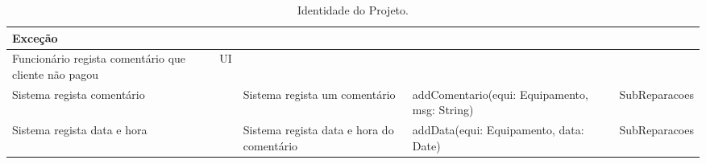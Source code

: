 \documentclass[../relatorio.tex]{subfiles}
\begin{document}
\begin{landscape}
\begin{table}[!h]
\begin{tabular}{|p{5cm}|p{1cm}|p{4cm}|p{6cm}|p{3cm}|}
            \rowcolor{red!30}
            Exceção  &   &   &    & \\
            \hline
            \rowcolor{yellow}
            Funcionário regista comentário que cliente não pagou
                    & UI
                    &
                    &
                    &
            \\
            \hline
            Sistema regista comentário
                    & 
                    & Sistema regista um comentário
                    & addComentario(equi: Equipamento, msg: String)
                    & SubReparacoes
            \\
            \hline
            Sistema regista data e hora
                    & 
                    & Sistema regista data e hora do comentário
                    & addData(equi: Equipamento, data: Date)
                    & SubReparacoes
            \\
            \hline
        \end{tabular}
        \caption{Identidade do Projeto.}
    \end{table}
\end{landscape}
\end{document}

